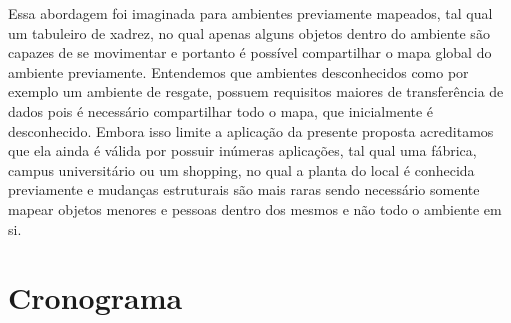 \documentclass[eq,capa]{texufpel}
\begin{document}


Essa abordagem foi imaginada para ambientes previamente mapeados, tal qual um tabuleiro de xadrez, no qual apenas alguns objetos dentro do ambiente são capazes de se movimentar e portanto é possível compartilhar o mapa global do ambiente previamente. Entendemos que ambientes desconhecidos como por exemplo um ambiente de resgate, possuem requisitos maiores de transferência de dados pois é necessário compartilhar todo o mapa, que inicialmente é desconhecido. Embora isso limite a aplicação da presente proposta acreditamos que ela ainda é válida por possuir inúmeras aplicações, tal qual uma fábrica, campus universitário ou um shopping, no qual a planta do local é conhecida previamente e mudanças estruturais são mais raras sendo necessário somente mapear objetos menores e pessoas dentro dos mesmos e não todo o ambiente em si.


\chapter{Cronograma}
\end{document}
